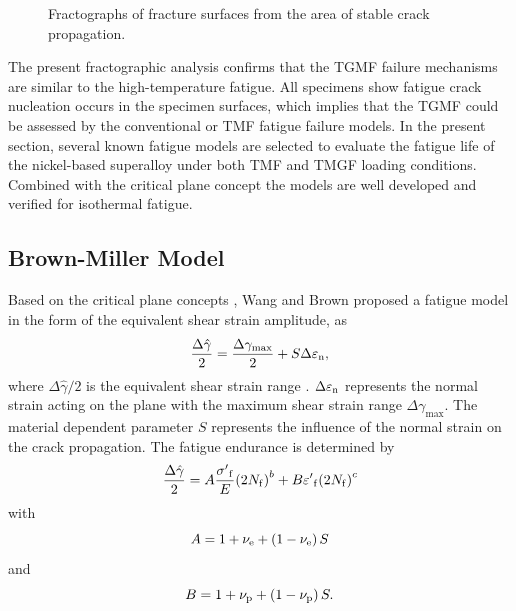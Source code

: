 \documentclass[preprint,5p,twocolumn,10pt,sort&compress]{elsarticle}
\begin{document}
\begin{figure}[!ht]
  \caption{Fractographs of fracture surfaces from the area of stable crack propagation.}
  \label{Fig:fatigue_striations_TGMF}
\end{figure}

The present fractographic analysis confirms that the TGMF failure mechanisms are similar to the high-temperature fatigue. All specimens show fatigue crack nucleation occurs in the specimen surfaces, which implies that the TGMF could be assessed by the conventional or TMF fatigue failure models. In the present section, several known fatigue models are selected to evaluate the fatigue life of the nickel-based superalloy under both TMF and TMGF loading conditions. Combined with the critical plane concept the models are well developed and verified for isothermal fatigue.


\subsection{Brown-Miller Model}
{Based on the critical plane concepts \cite{Brown2006}, Wang and Brown \cite{Wang1993} proposed a  fatigue model in the form of the equivalent shear strain amplitude}, as
\begin{equation}
\frac{{\Delta \hat \gamma }}{2} = \frac{{\Delta {\gamma _{\max}}}}{2} + S\Delta {\varepsilon _{\rm n}},
\label{Equ:ShearStrainBM}
\end{equation}
where ${{\Delta \hat \gamma }}/{2}$ is the equivalent shear strain range \cite{Wang1993}. $\Delta {\varepsilon _{\rm n}}$ represents the normal strain acting on the plane with the maximum shear strain range $\Delta {\gamma _{\max}}$. The material dependent parameter $S$ represents the influence of the normal strain on the crack propagation.
The fatigue endurance is determined by 
\begin{equation}
\frac{{\Delta \hat \gamma }}{2} = A\frac{{{{\sigma '}_{\rm f}}}}{E}{\left( {2{N_{\rm f}}} \right)^b} + B{{\varepsilon '}_{\rm f}}{\left( {2{N_{\rm f}}} \right)^c}
\end{equation}
with
\[A = 1 + {\nu _{\rm e}} + \left( {1 - {\nu _{\rm e}}} \right)S\]
and
\[B = 1 + {\nu _{\rm p}} + \left( {1 - {\nu _{\rm p}}} \right)S.\]
\end{document}
